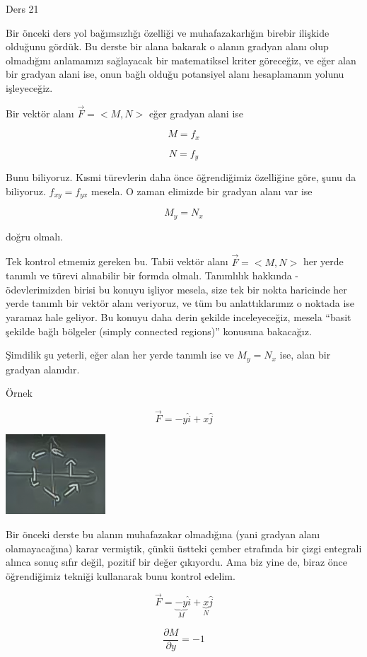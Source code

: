 \documentclass[12pt,fleqn]{article}\usepackage{../../common}
\begin{document}
Ders 21

Bir önceki ders yol bağımsızlığı özelliği ve muhafazakarlığın birebir ilişkide
olduğunu gördük. Bu derste bir alana bakarak o alanın gradyan alanı olup
olmadığını anlamamızı sağlayacak bir matematiksel kriter göreceğiz, ve eğer alan
bir gradyan alani ise, onun bağlı olduğu potansiyel alanı hesaplamanın yolunu
işleyeceğiz.

Bir vektör alanı $\vec{F} = < M,N >$ eğer gradyan alani ise 

$$ M = f_x $$

$$ N = f_y $$

Bunu biliyoruz. Kısmi türevlerin daha önce öğrendiğimiz özelliğine göre, şunu da
biliyoruz. $f_{xy} = f_{yx}$ mesela. O zaman elimizde bir gradyan alanı var ise

$$ M_y = N_x $$

doğru olmalı. 

Tek kontrol etmemiz gereken bu. Tabii vektör alanı $\vec{F} = < M,N >$ her yerde
tanımlı ve türevi alınabilir bir formda olmalı. Tanımlılık hakkında -
ödevlerimizden birisi bu konuyu işliyor mesela, size tek bir nokta haricinde her
yerde tanımlı bir vektör alanı veriyoruz, ve tüm bu anlattıklarımız o noktada
ise yaramaz hale geliyor. Bu konuyu daha derin şekilde inceleyeceğiz, mesela
``basit şekilde bağlı bölgeler (simply connected regions)'' konusuna bakacağız.

Şimdilik şu yeterli, eğer alan her yerde tanımlı ise ve $M_y = N_x$ ise,
alan bir gradyan alanıdır. 

Örnek 

$$ \vec{F} = -y\hat{i} + x\hat{j} $$

\includegraphics[height=3cm]{21_1.png}

Bir önceki derste bu alanın muhafazakar olmadığına (yani gradyan alanı
olamayacağına) karar vermiştik, çünkü üstteki çember etrafında bir çizgi
entegrali alınca sonuç sıfır değil, pozitif bir değer çıkıyordu. Ama biz yine
de, biraz önce öğrendiğimiz tekniği kullanarak bunu kontrol edelim.

$$ \vec{F} = \underbrace{-y}_{M}\hat{i} + 
\underbrace{x}_{N}\hat{j} 
$$

$$ \frac{\partial M}{\partial y} = -1 $$
\end{document}
